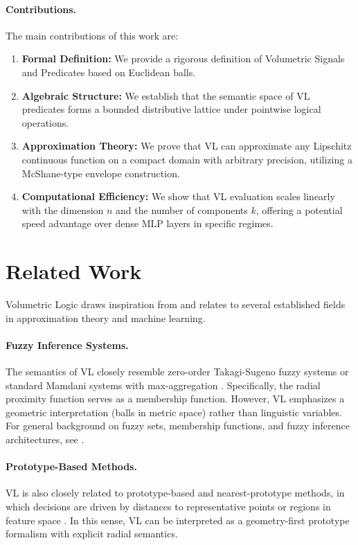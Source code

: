 \documentclass[11pt]{article}
\begin{document}
\paragraph{Contributions.} The main contributions of this work are:
\begin{enumerate}
    \item \textbf{Formal Definition:} We provide a rigorous definition of Volumetric Signals and Predicates based on Euclidean balls.
    \item \textbf{Algebraic Structure:} We establish that the semantic space of VL predicates forms a bounded distributive lattice under pointwise logical operations.
    \item \textbf{Approximation Theory:} We prove that VL can approximate any Lipschitz continuous function on a compact domain with arbitrary precision, utilizing a McShane-type envelope construction.
    \item \textbf{Computational Efficiency:} We show that VL evaluation scales linearly with the dimension $n$ and the number of components $k$, offering a potential speed advantage over dense MLP layers in specific regimes.
\end{enumerate}

\section{Related Work}

Volumetric Logic draws inspiration from and relates to several established fields in approximation theory and machine learning.

\paragraph{Fuzzy Inference Systems.}
The semantics of VL closely resemble zero-order Takagi-Sugeno fuzzy systems \cite{takagi1985fuzzy} or standard Mamdani systems with max-aggregation \cite{mamdani1975experiment}. Specifically, the radial proximity function serves as a membership function. However, VL emphasizes a geometric interpretation (balls in metric space) rather than linguistic variables. For general background on fuzzy sets, membership functions, and fuzzy inference architectures, see \cite{klir1995fuzzy}.

\paragraph{Prototype-Based Methods.}
VL is also closely related to prototype-based and nearest-prototype methods, in which decisions are driven by distances to representative points or regions in feature space \cite{bezdek2001nearest}. In this sense, VL can be interpreted as a geometry-first prototype formalism with explicit radial semantics.
\end{document}
